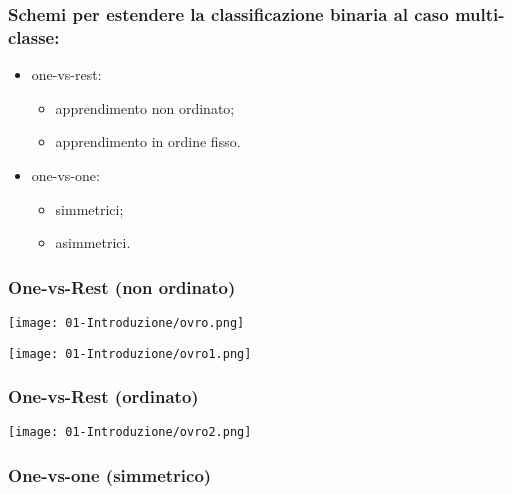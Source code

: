 \subsubsection{Schemi per estendere la classificazione binaria al caso multi-classe:}

\begin{itemize}
  \item one-vs-rest:
    \begin{itemize}
      \item apprendimento non ordinato;
      \item apprendimento in ordine fisso.
    \end{itemize}
  \item one-vs-one:
    \begin{itemize}
      \item simmetrici;
      \item asimmetrici.
    \end{itemize}
\end{itemize}

\subsubsection{One-vs-Rest (non ordinato)}

\begin{center} 
 \texttt{[image: 01-Introduzione/ovro.png]}
\end{center}


\begin{center} 
 \texttt{[image: 01-Introduzione/ovro1.png]}
\end{center}

\subsubsection{One-vs-Rest (ordinato)}

\begin{center} 
 \texttt{[image: 01-Introduzione/ovro2.png]}
\end{center}

\subsubsection{One-vs-one (simmetrico)}

